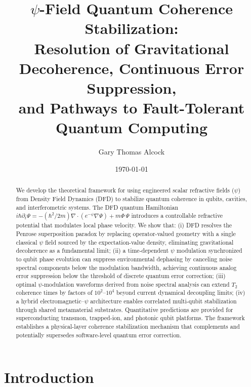 \documentclass[aps,prd,twocolumn,superscriptaddress,nofootinbib]{revtex4-2}
\begin{document}
\title{$\psi$-Field Quantum Coherence Stabilization:\\
Resolution of Gravitational Decoherence, Continuous Error Suppression,\\
and Pathways to Fault-Tolerant Quantum Computing}

\author{Gary Thomas Alcock}

\date{\today}

\begin{abstract}
We develop the theoretical framework for using engineered scalar refractive
fields ($\psi$) from Density Field Dynamics (DFD) to stabilize quantum
coherence in qubits, cavities, and interferometric systems. The DFD
quantum Hamiltonian $i\hbar\partial_t\Psi = -(\hbar^2/2m)\nabla\cdot
(e^{-\psi}\nabla\Psi) + m\Phi\,\Psi$ introduces a controllable
refractive potential that modulates local phase velocity. We show that:
(i) DFD resolves the Penrose superposition paradox by replacing
operator-valued geometry with a single classical $\psi$ field sourced by
the expectation-value density, eliminating gravitational decoherence as a
fundamental limit; (ii) a time-dependent $\psi$ modulation synchronized
to qubit phase evolution can suppress environmental dephasing by
canceling noise spectral components below the modulation bandwidth,
achieving continuous analog error suppression below the threshold of
discrete quantum error correction; (iii) optimal $\psi$-modulation
waveforms derived from noise spectral analysis can extend $T_2$ coherence
times by factors of $10^2$--$10^4$ beyond current dynamical decoupling
limits; (iv) a hybrid electromagnetic--$\psi$ architecture enables
correlated multi-qubit stabilization through shared metamaterial
substrates. Quantitative predictions are provided for superconducting
transmon, trapped-ion, and photonic qubit platforms. The framework
establishes a physical-layer coherence stabilization mechanism that
complements and potentially supersedes software-level quantum error
correction.
\end{abstract}

\maketitle

\section{Introduction}\label{sec:intro}
\end{document}
